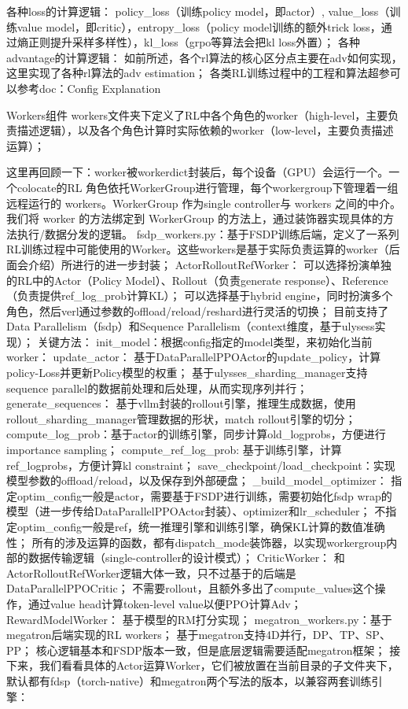 \documentclass{pkuthesis}
\begin{document}
各种loss的计算逻辑：
policy_loss（训练policy model，即actor）, value_loss（训练value model，即critic），entropy_loss（policy model训练的额外trick loss，通过熵正则提升采样多样性），kl_loss（grpo等算法会把kl loss外置）；
各种advantage的计算逻辑：
如前所述，各个rl算法的核心区分点主要在adv如何实现，这里实现了各种rl算法的adv estimation；
各类RL训练过程中的工程和算法超参可以参考doc：Config Explanation

Workers组件
workers文件夹下定义了RL中各个角色的worker（high-level，主要负责描述逻辑），以及各个角色计算时实际依赖的worker（low-level，主要负责描述运算）；

这里再回顾一下：worker被workerdict封装后，每个设备（GPU）会运行一个。一个colocate的RL 角色依托WorkerGroup进行管理，每个workergroup下管理着一组远程运行的 workers。WorkerGroup 作为single controller与 workers 之间的中介。我们将 worker 的方法绑定到 WorkerGroup 的方法上，通过装饰器实现具体的方法执行/数据分发的逻辑。
fsdp_workers.py：基于FSDP训练后端，定义了一系列RL训练过程中可能使用的Worker。这些workers是基于实际负责运算的worker（后面会介绍）所进行的进一步封装；
ActorRolloutRefWorker：
可以选择扮演单独的RL中的Actor（Policy Model）、Rollout（负责generate response）、Reference（负责提供ref_log_prob计算KL）；
可以选择基于hybrid engine，同时扮演多个角色，然后verl通过参数的offload/reload/reshard进行灵活的切换；
目前支持了Data Parallelism（fsdp）和Sequence Parallelism（context维度，基于ulysess实现）；
关键方法：
init_model：根据config指定的model类型，来初始化当前worker：
update_actor：
基于DataParallelPPOActor的update_policy，计算policy-Loss并更新Policy模型的权重；
基于ulysses_sharding_manager支持sequence parallel的数据前处理和后处理，从而实现序列并行；
generate_sequences：
基于vllm封装的rollout引擎，推理生成数据，使用rollout_sharding_manager管理数据的形状，match rollout引擎的切分；
compute_log_prob：基于actor的训练引擎，同步计算old_logprobs，方便进行importance sampling；
compute_ref_log_prob: 基于训练引擎，计算ref_logprobs，方便计算kl constraint；
save_checkpoint/load_checkpoint：实现模型参数的offload/reload，以及保存到外部硬盘；
_build_model_optimizer：
指定optim_config一般是actor，需要基于FSDP进行训练，需要初始化fsdp wrap的模型（进一步传给DataParallelPPOActor封装）、optimizer和lr_scheduler；
不指定optim_config一般是ref，统一推理引擎和训练引擎，确保KL计算的数值准确性；
所有的涉及运算的函数，都有dispatch_mode装饰器，以实现workergroup内部的数据传输逻辑（single-controller的设计模式）；
CriticWorker：
和ActorRolloutRefWorker逻辑大体一致，只不过基于的后端是DataParallelPPOCritic；
不需要rollout，且额外多出了compute_values这个操作，通过value head计算token-level value以便PPO计算Adv；
RewardModelWorker：
基于模型的RM打分实现；
megatron_workers.py：基于megatron后端实现的RL workers；
基于megatron支持4D并行，DP、TP、SP、PP；
核心逻辑基本和FSDP版本一致，但是底层逻辑需要适配megatron框架；
接下来，我们看看具体的Actor运算Worker，它们被放置在当前目录的子文件夹下，默认都有fdsp（torch-native）和megatron两个写法的版本，以兼容两套训练引擎：
\end{document}
